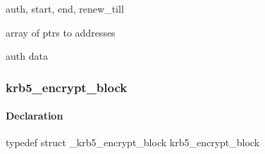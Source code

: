 \documentclass[letterpaper,10pt,english]{sphinxmanual}
\begin{document}

\begin{fulllineitems}
\label{appdev/refs/types/krb5_enc_tkt_part:krb5_enc_tkt_part.times}
auth, start, end, renew\_till

\end{fulllineitems}


\begin{fulllineitems}
\label{appdev/refs/types/krb5_enc_tkt_part:krb5_enc_tkt_part.caddrs}
array of ptrs to addresses

\end{fulllineitems}


\begin{fulllineitems}
\label{appdev/refs/types/krb5_enc_tkt_part:krb5_enc_tkt_part.authorization_data}
auth data

\end{fulllineitems}



\subsubsection{krb5\_encrypt\_block}
\label{appdev/refs/types/krb5_encrypt_block:krb5-encrypt-block}\label{appdev/refs/types/krb5_encrypt_block:krb5-encrypt-block-struct}\label{appdev/refs/types/krb5_encrypt_block::doc}

\begin{fulllineitems}
\label{appdev/refs/types/krb5_encrypt_block:krb5_encrypt_block}
\end{fulllineitems}



\paragraph{Declaration}
\label{appdev/refs/types/krb5_encrypt_block:declaration}
typedef struct \_krb5\_encrypt\_block  krb5\_encrypt\_block
\end{document}
